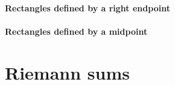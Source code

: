\documentclass{ximera}
\begin{document}
\paragraph{Rectangles defined by a right endpoint}


\paragraph{Rectangles defined by a midpoint}

\section{Riemann sums}
\end{document}
